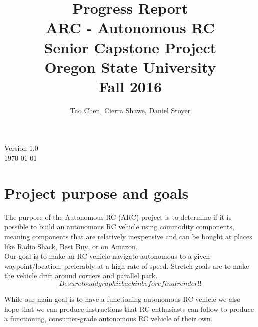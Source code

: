 \documentclass[compsoc,draftclsnofoot,onecolumn,10pt]{IEEEtran}
\date{}
\begin{document}
\begin{titlepage}
\title{
Progress Report\\
\LARGE
ARC - Autonomous RC\\
Senior Capstone Project\\
Oregon State University\\
Fall 2016
}
\author{Tao Chen, Cierra Shawe, Daniel Stoyer}
\maketitle
\begin{center}
	Version 1.0\\
	\today
\end{center}

\thispagestyle{empty} %
	
\end{titlepage}

\tableofcontents

\newpage

\section{Project purpose and goals} 
The purpose of the Autonomous RC (ARC) project is to determine if it is possible
to build an autonomous RC vehicle using commodity components, meaning components
that are relatively inexpensive and can be bought at places like Radio
Shack\textsuperscript{\textregistered}, Best Buy\textsuperscript{\textregistered}, or on Amazon. \\
Our goal is to make an RC vehicle navigate autonomous to a given
waypoint/location, preferably at a high rate of speed. Stretch goals are to
make the vehicle drift around corners and parallel park.\\

\[Be sure to add graphic back in before final render!!\]

While our main goal is to have a functioning autonomous RC vehicle we also hope
that we can produce instructions that RC enthusiasts can follow to produce a
functioning, consumer-grade autonomous RC vehicle of their own.
\end{document}
